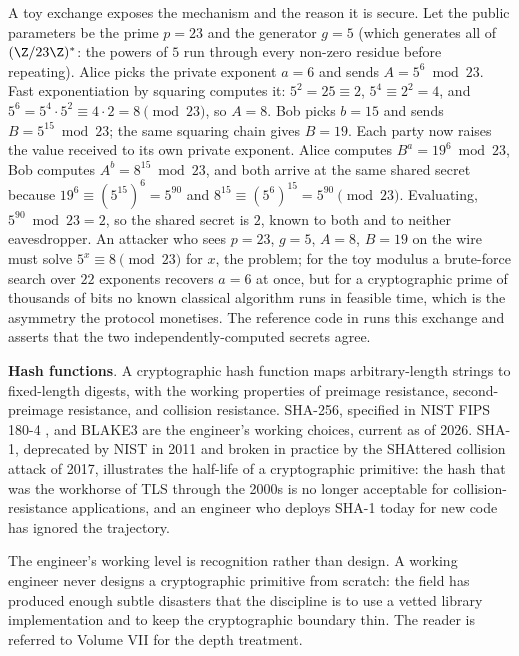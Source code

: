 A toy exchange exposes the mechanism and the reason it is secure. Let
the public parameters be the prime $p = 23$ and the generator $g = 5$
(which generates all of $(\Z/23\Z)^{\ast}$: the powers of $5$ run
through every non-zero residue before repeating). Alice picks the
private exponent $a = 6$ and sends $A = 5^{6} \bmod 23$. Fast
exponentiation by squaring computes it: $5^{2} = 25 \equiv 2$,
$5^{4} \equiv 2^{2} = 4$, and $5^{6} = 5^{4} \cdot 5^{2} \equiv 4
\cdot 2 = 8 \pmod{23}$, so $A = 8$. Bob picks $b = 15$ and sends
$B = 5^{15} \bmod 23$; the same squaring chain gives $B = 19$. Each
party now raises the value received to its own private exponent.
Alice computes $B^{a} = 19^{6} \bmod 23$, Bob computes $A^{b} = 8^{15}
\bmod 23$, and both arrive at the same shared secret because
$19^{6} \equiv (5^{15})^{6} = 5^{90}$ and $8^{15} \equiv (5^{6})^{15}
= 5^{90} \pmod{23}$. Evaluating, $5^{90} \bmod 23 = 2$, so the shared
secret is $2$, known to both and to neither eavesdropper. An attacker
who sees $p = 23$, $g = 5$, $A = 8$, $B = 19$ on the wire must solve
$5^{x} \equiv 8 \pmod{23}$ for $x$, the 
problem; for the toy modulus a brute-force search over $22$ exponents
recovers $a = 6$ at once, but for a cryptographic prime of thousands
of bits no known classical algorithm runs in feasible time, which is
the asymmetry the protocol monetises. The reference code in
runs this exchange and asserts that the two independently-computed
secrets agree.

\textbf{Hash functions}. A cryptographic hash function maps
arbitrary-length strings to fixed-length digests, with the working
properties of preimage resistance, second-preimage resistance, and
collision resistance. SHA-256, specified in NIST FIPS 180-4
\cite{std:v2ch17-nist-fips-180-4}, and BLAKE3 are the engineer's
working choices, current as of 2026. SHA-1, deprecated by NIST in
2011 and broken in practice by the SHAttered collision attack of
2017, illustrates the half-life of a cryptographic primitive: the
hash that was the workhorse of TLS through the 2000s is no longer
acceptable for collision-resistance applications, and an engineer
who deploys SHA-1 today for new code has ignored the trajectory.

The engineer's working level is recognition rather than design. A
working engineer never designs a cryptographic primitive from
scratch: the field has produced enough subtle disasters that the
discipline is to use a vetted library implementation and to keep
the cryptographic boundary thin. The reader is referred to Volume
VII for the depth treatment.

